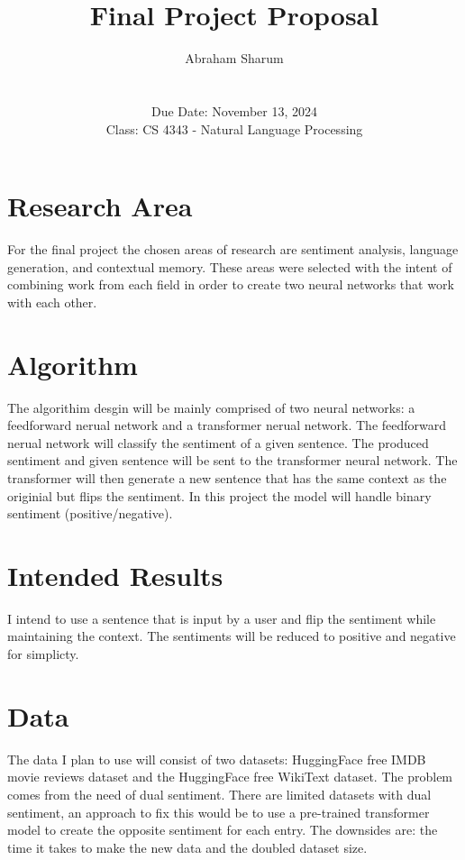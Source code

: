 \documentclass[10pt,titlepage]{article}
\title{Final Project Proposal}
\author{Abraham Sharum \\\\ \\ Due Date: November 13, 2024 \\ Class: CS 4343 - Natural Language Processing}
\begin{document}
	\pagestyle{fancy}
	\fancyhead{}
	\fancyfoot{}
	\fancyfoot[CE,CO]{\textbf{\thepage}}
	\maketitle
	
	\section*{Research Area}
	\begin{spverbatim}
		For the final project the chosen areas of research are sentiment analysis, language generation, and contextual memory. These areas were selected with the intent of combining work from each field in order to create two neural networks that work with each other.
	\end{spverbatim}
	\section*{Algorithm}
	\begin{spverbatim}
		The algorithim desgin will be mainly comprised of two neural networks: a feedforward nerual network and a transformer nerual network. The feedforward nerual network will classify the sentiment of a given sentence. The produced sentiment and given sentence will be sent to the transformer neural network. The transformer will then generate a new sentence that has the same context as the originial but flips the sentiment. In this project the model will handle binary sentiment (positive/negative).
	\end{spverbatim}
	\section*{Intended Results}
	\begin{spverbatim}
		I intend to use a sentence that is input by a user and flip the sentiment while maintaining the context. The sentiments will be reduced to positive and negative for simplicty.
	\end{spverbatim}
	\section*{Data}
	\begin{spverbatim}
		The data I plan to use will consist of two datasets: HuggingFace free IMDB movie reviews dataset and the HuggingFace free WikiText dataset. The problem comes from the need of dual sentiment. There are limited datasets with dual sentiment, an approach to fix this would be to use a pre-trained transformer model to create the opposite sentiment for each entry. The downsides are: the time it takes to make the new data and the doubled dataset size.
	\end{spverbatim}
\end{document}
